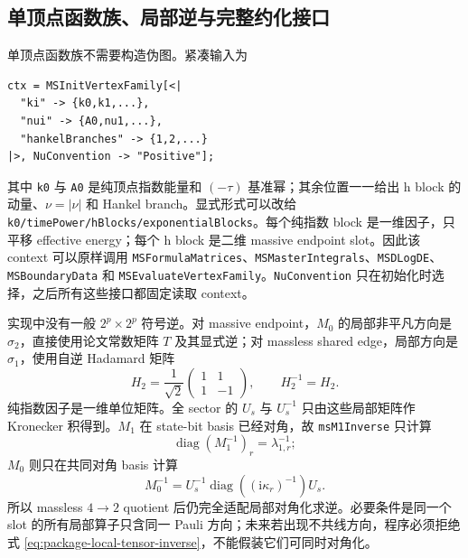 \documentclass[11pt,a4paper]{ctexart}
\newcommand{\ii}{\mathrm i}
\begin{document}
\subsection{单顶点函数族、局部逆与完整约化接口}

单顶点函数族不需要构造伪图。紧凑输入为
\begin{verbatim}
ctx = MSInitVertexFamily[<|
  "ki" -> {k0,k1,...},
  "nui" -> {A0,nu1,...},
  "hankelBranches" -> {1,2,...}
|>, NuConvention -> "Positive"];
\end{verbatim}
其中 \texttt{k0} 与 \texttt{A0} 是纯顶点指数能量和 $(-\tau)$ 基准幂；其余位置一一给出 h block 的动量、$\nu=|\nu|$ 和 Hankel branch。显式形式可以改给 \texttt{k0/timePower/hBlocks/exponentialBlocks}。每个纯指数 block 是一维因子，只平移 effective energy；每个 h block 是二维 massive endpoint slot。因此该 context 可以原样调用 \texttt{MSFormulaMatrices}、\texttt{MSMasterIntegrals}、\texttt{MSDLogDE}、\texttt{MSBoundaryData} 和 \texttt{MSEvaluateVertexFamily}。\texttt{NuConvention} 只在初始化时选择，之后所有这些接口都固定读取 context。

实现中没有一般 $2^p\times2^p$ 符号逆。对 massive endpoint，$M_0$ 的局部非平凡方向是 $\sigma_2$，直接使用论文常数矩阵 $T$ 及其显式逆；对 massless shared edge，局部方向是 $\sigma_1$，使用自逆 Hadamard 矩阵
\begin{equation}
 H_2=\frac1{\sqrt2}
 \begin{pmatrix}1&1\\1&-1\end{pmatrix},
 \qquad H_2^{-1}=H_2.
 \label{eq:package-hadamard-inverse}
\end{equation}
纯指数因子是一维单位矩阵。全 sector 的 $U_s$ 与 $U_s^{-1}$ 只由这些局部矩阵作 Kronecker 积得到。$M_1$ 在 state-bit basis 已经对角，故 \texttt{msM1Inverse} 只计算
\begin{equation}
 \operatorname{diag}(M_1^{-1})_r=\lambda_{1,r}^{-1};
\end{equation}
$M_0$ 则只在共同对角 basis 计算
\begin{equation}
 M_0^{-1}=U_s^{-1}\operatorname{diag}
 \left((\ii\kappa_r)^{-1}\right)U_s.
 \label{eq:package-local-tensor-inverse}
\end{equation}
所以 massless $4\to2$ quotient 后仍完全适配局部对角化求逆。必要条件是同一个 slot 的所有局部算子只含同一 Pauli 方向；未来若出现不共线方向，程序必须拒绝式 \eqref{eq:package-local-tensor-inverse}，不能假装它们可同时对角化。
\end{document}
